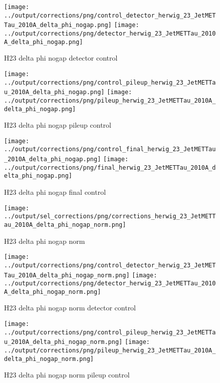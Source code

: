\documentclass[11pt]{book}
\begin{document}
\begin{figure}[ht]
\centering
\texttt{[image: ../output/corrections/png/control\_detector\_herwig\_23\_JetMETTau\_2010A\_delta\_phi\_nogap.png]}
\texttt{[image: ../output/corrections/png/detector\_herwig\_23\_JetMETTau\_2010A\_delta\_phi\_nogap.png]}
\caption{H23 delta phi nogap detector control}
\label{fig:H23_JetMETTau_2010A_delta_phi_nogap_detector_control}
\end{figure}

\begin{figure}[ht]
\centering
\texttt{[image: ../output/corrections/png/control\_pileup\_herwig\_23\_JetMETTau\_2010A\_delta\_phi\_nogap.png]}
\texttt{[image: ../output/corrections/png/pileup\_herwig\_23\_JetMETTau\_2010A\_delta\_phi\_nogap.png]}
\caption{H23 delta phi nogap pileup control}
\label{fig:H23_JetMETTau_2010A_delta_phi_nogap_pileup_control}
\end{figure}


\begin{figure}[ht]
\centering
\texttt{[image: ../output/corrections/png/control\_final\_herwig\_23\_JetMETTau\_2010A\_delta\_phi\_nogap.png]}
\texttt{[image: ../output/corrections/png/final\_herwig\_23\_JetMETTau\_2010A\_delta\_phi\_nogap.png]}
\caption{H23 delta phi nogap final control}
\label{fig:H23_JetMETTau_2010A_delta_phi_nogap_final_control}
\end{figure}


\begin{figure}[ht]
\centering
\texttt{[image: ../output/sel\_corrections/png/corrections\_herwig\_23\_JetMETTau\_2010A\_delta\_phi\_nogap\_norm.png]}
\caption{H23 delta phi nogap norm}
\label{fig:H23_JetMETTau_2010A_delta_phi_nogap_norm}
\end{figure}

\begin{figure}[ht]
\centering
\texttt{[image: ../output/corrections/png/control\_detector\_herwig\_23\_JetMETTau\_2010A\_delta\_phi\_nogap\_norm.png]}
\texttt{[image: ../output/corrections/png/detector\_herwig\_23\_JetMETTau\_2010A\_delta\_phi\_nogap\_norm.png]}
\caption{H23 delta phi nogap norm detector control}
\label{fig:H23_JetMETTau_2010A_delta_phi_nogap_norm_detector_control}
\end{figure}

\begin{figure}[ht]
\centering
\texttt{[image: ../output/corrections/png/control\_pileup\_herwig\_23\_JetMETTau\_2010A\_delta\_phi\_nogap\_norm.png]}
\texttt{[image: ../output/corrections/png/pileup\_herwig\_23\_JetMETTau\_2010A\_delta\_phi\_nogap\_norm.png]}
\caption{H23 delta phi nogap norm pileup control}
\label{fig:H23_JetMETTau_2010A_delta_phi_nogap_norm_pileup_control}
\end{figure}
\end{document}
